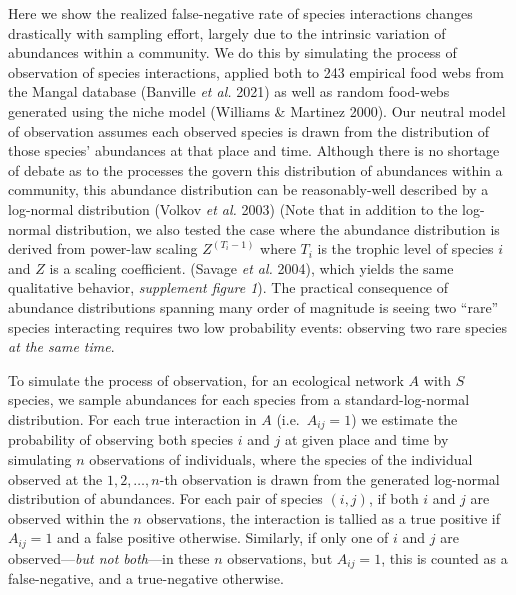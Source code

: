 \documentclass[11pt]{article}
\begin{document}
Here we show the realized false-negative rate of species interactions
changes drastically with sampling effort, largely due to the intrinsic
variation of abundances within a community. We do this by simulating the
process of observation of species interactions, applied both to 243
empirical food webs from the Mangal database (Banville \emph{et al.}
2021) as well as random food-webs generated using the niche model
(Williams \& Martinez 2000). Our neutral model of observation assumes
each observed species is drawn from the distribution of those species'
abundances at that place and time. Although there is no shortage of
debate as to the processes the govern this distribution of abundances
within a community, this abundance distribution can be reasonably-well
described by a log-normal distribution (Volkov \emph{et al.} 2003) (Note
that in addition to the log-normal distribution, we also tested the case
where the abundance distribution is derived from power-law scaling
\(Z^{(T_i-1)}\) where \(T_i\) is the trophic level of species \(i\) and
\(Z\) is a scaling coefficient. (Savage \emph{et al.} 2004), which
yields the same qualitative behavior, \emph{supplement figure 1}). The
practical consequence of abundance distributions spanning many order of
magnitude is seeing two ``rare'' species interacting requires two low
probability events: observing two rare species \emph{at the same time}.

To simulate the process of observation, for an ecological network \(A\)
with \(S\) species, we sample abundances for each species from a
standard-log-normal distribution. For each true interaction in \(A\)
(i.e.~\(A_{ij} = 1\)) we estimate the probability of observing both
species \(i\) and \(j\) at given place and time by simulating \(n\)
observations of individuals, where the species of the individual
observed at the \(1,2,\dots,n\)-th observation is drawn from the
generated log-normal distribution of abundances. For each pair of
species \((i,j)\), if both \(i\) and \(j\) are observed within the \(n\)
observations, the interaction is tallied as a true positive if
\(A_{ij}=1\) and a false positive otherwise. Similarly, if only one of
\(i\) and \(j\) are observed---\emph{but not both}---in these \(n\)
observations, but \(A_{ij}=1\), this is counted as a false-negative, and
a true-negative otherwise.
\end{document}
